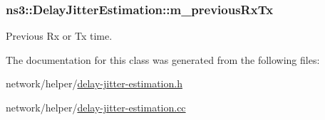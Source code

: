 \subsubsection[{\texorpdfstring{m\+\_\+previous\+Rx\+Tx}{m_previousRxTx}}]{ ns3\+::\+Delay\+Jitter\+Estimation\+::m\+\_\+previous\+Rx\+Tx\hspace{0.3cm}{\ttfamily [private]}}\hypertarget{classns3_1_1DelayJitterEstimation_ae072ffd2955965756add116846e5d9e5}{}\label{classns3_1_1DelayJitterEstimation_ae072ffd2955965756add116846e5d9e5}


Previous Rx or Tx time. 



The documentation for this class was generated from the following files\+:\begin{DoxyCompactItemize}
\item 
network/helper/\hyperlink{delay-jitter-estimation_8h}{delay-\/jitter-\/estimation.\+h}\item 
network/helper/\hyperlink{delay-jitter-estimation_8cc}{delay-\/jitter-\/estimation.\+cc}\end{DoxyCompactItemize}
